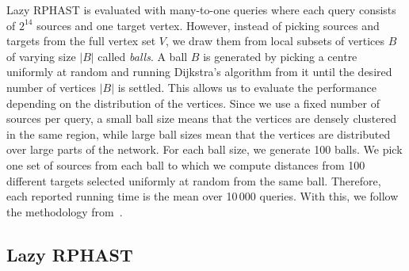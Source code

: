 \documentclass[manuscript,review]{acmart}
\begin{document}
Lazy RPHAST is evaluated with many-to-one queries where each query consists of $2^{14}$ sources and one target vertex.
However, instead of picking sources and targets from the full vertex set $V$, we draw them from local subsets of vertices $B$ of varying size $|B|$ called \emph{balls}.
A ball $B$ is generated by picking a centre uniformly at random and running Dijkstra's algorithm from it until the desired number of vertices $|B|$ is settled.
This allows us to evaluate the performance depending on the distribution of the vertices.
Since we use a fixed number of sources per query, a small ball size means that the vertices are densely clustered in the same region, while large ball sizes mean that the vertices are distributed over large parts of the network.
For each ball size, we generate 100 balls.
We pick one set of sources from each ball to which we compute distances from 100 different targets selected uniformly at random from the same ball.
Therefore, each reported running time is the mean over 10\,000 queries.
With this, we follow the methodology from~\cite{delling_et_al:OASIcs:2011:3266}.

\subsection{Lazy RPHAST}\label{sec:exp_lazy_rphast}
\end{document}
